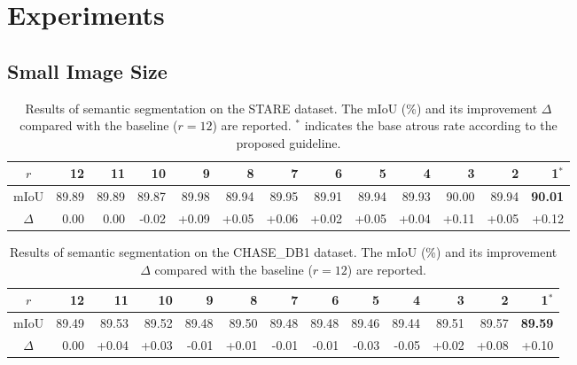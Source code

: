 \documentclass{article}
\begin{document}
\section{Experiments}
\label{sec:exp}

\subsection{Small Image Size}

\begin{table}[t!]
	\caption{Results of semantic segmentation on the STARE dataset. The mIoU (\%) and its improvement $\Delta$ compared with the baseline ($r=12$) are reported. $^*$ indicates the base atrous rate according to the proposed guideline.}
	\label{tab:stare}
	\centering
    \begin{adjustbox}{width=\textwidth,center}
	\begin{tabular}{c|rrrrrrrrrrrr}
		\toprule
		$r$      & 12    & 11    & 10    & 9     & 8     & 7     & 6     & 5     & 4     & 3     & 2     & 1$^*$          \\
		\midrule
		mIoU     & 89.89 & 89.89 & 89.87 & 89.98 & 89.94 & 89.95 & 89.91 & 89.94 & 89.93 & 90.00 & 89.94 & \textbf{90.01} \\
		$\Delta$ & 0.00  & 0.00  & -0.02 & +0.09 & +0.05 & +0.06 & +0.02 & +0.05 & +0.04 & +0.11 & +0.05 & +0.12          \\
		\bottomrule
	\end{tabular}
    \end{adjustbox}
\end{table}

\begin{table}[t!]
	\caption{Results of semantic segmentation on the CHASE\_DB1 dataset. The mIoU (\%) and its improvement $\Delta$ compared with the baseline ($r=12$) are reported.}
	\label{tab:chase}
	\centering
    \begin{adjustbox}{width=\textwidth,center}
	\begin{tabular}{c|rrrrrrrrrrrr}
		\toprule
		$r$      & 12    & 11    & 10    & 9     & 8     & 7     & 6     & 5     & 4     & 3     & 2     & 1$^*$          \\
		\midrule
		mIoU     & 89.49 & 89.53 & 89.52 & 89.48 & 89.50 & 89.48 & 89.48 & 89.46 & 89.44 & 89.51 & 89.57 & \textbf{89.59} \\
		$\Delta$ & 0.00  & +0.04 & +0.03 & -0.01 & +0.01 & -0.01 & -0.01 & -0.03 & -0.05 & +0.02 & +0.08 & +0.10          \\
		\bottomrule
	\end{tabular}
    \end{adjustbox}
\end{table}
\end{document}
